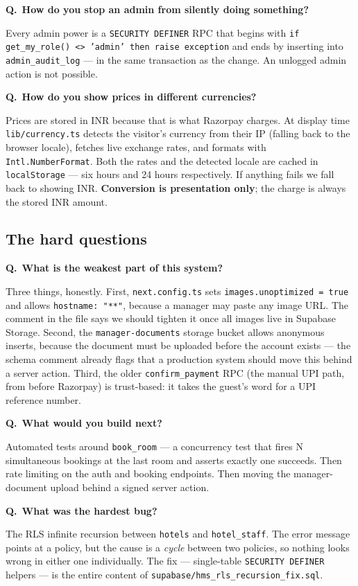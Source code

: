 \documentclass[11pt,a4paper]{article}
\newcommand{\Q}[1]{\vspace{7pt}\noindent\textbf{\color{primary}Q.}~\textbf{#1}\par\vspace{1pt}}
\newcommand{\A}[1]{\noindent #1\par}
\newcommand{\file}[1]{\texttt{\small #1}}
\begin{document}
\Q{How do you stop an admin from silently doing something?}
\A{Every admin power is a \texttt{SECURITY DEFINER} RPC that begins with
\texttt{if get\_my\_role() <> 'admin' then raise exception} and ends by inserting
into \texttt{admin\_audit\_log} --- in the same transaction as the change. An
unlogged admin action is not possible.}

\Q{How do you show prices in different currencies?}
\A{Prices are stored in INR because that is what Razorpay charges. At display time
\file{lib/currency.ts} detects the visitor's currency from their IP (falling back to
the browser locale), fetches live exchange rates, and formats with
\texttt{Intl.NumberFormat}. Both the rates and the detected locale are cached in
\texttt{localStorage} --- six hours and 24 hours respectively. If anything fails we
fall back to showing INR. \textbf{Conversion is presentation only}; the charge is
always the stored INR amount.}

\subsection{The hard questions}

\Q{What is the weakest part of this system?}
\A{Three things, honestly. First, \file{next.config.ts} sets
\texttt{images.unoptimized = true} and allows \texttt{hostname: "**"}, because a
manager may paste any image URL. The comment in the file says we should tighten it
once all images live in Supabase Storage. Second, the \texttt{manager-documents}
storage bucket allows anonymous inserts, because the document must be uploaded
before the account exists --- the schema comment already flags that a production
system should move this behind a server action. Third, the older
\texttt{confirm\_payment} RPC (the manual UPI path, from before Razorpay) is
trust-based: it takes the guest's word for a UPI reference number.}

\Q{What would you build next?}
\A{Automated tests around \texttt{book\_room} --- a concurrency test that fires N
simultaneous bookings at the last room and asserts exactly one succeeds. Then rate
limiting on the auth and booking endpoints. Then moving the manager-document upload
behind a signed server action.}

\Q{What was the hardest bug?}
\A{The RLS infinite recursion between \texttt{hotels} and \texttt{hotel\_staff}.
The error message points at a policy, but the cause is a \emph{cycle} between two
policies, so nothing looks wrong in either one individually. The fix --- single-table
\texttt{SECURITY DEFINER} helpers --- is the entire content of
\file{supabase/hms\_rls\_recursion\_fix.sql}.}
\end{document}
